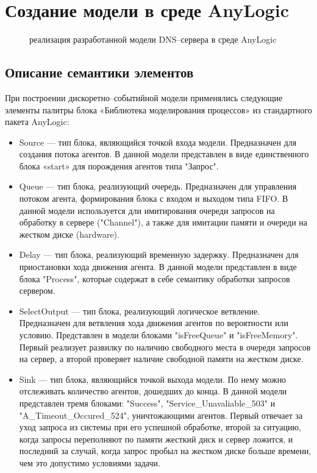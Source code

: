 \section{Создание модели в среде AnyLogic}
\begin{figure} [h]
    \caption{реализация разработанной модели DNS--сервера в среде AnyLogic}
\end{figure}


\subsection{Описание семантики элементов}
При построении дискоретно--событийной модели применялись следующие
элементы палитры блока «Библиотека моделирования процессов» из стандартного
пакета AnyLogic:
\begin{itemize}
    \item Source –-- тип блока, являющийся точкой входа модели. Предназначен для
    создания потока агентов. В данной модели представлен в виде единственного
    блока «start» для порождения агентов типа "Запрос".
    \item Queue –-- тип блока, реализующий очередь. Предназначен для управления
    потоком агента, формирования блока с входом и выходом типа FIFO. В
    данной модели используется дли имитирования очереди запросов на
    обработку в сервере ("Channel"), а также для имитации памяти и очереди на жестком
    диске (hardware).
    \item Delay –-- тип блока, реализующий временную задержку. Предназначен для
    приостановки хода движения агента. В данной модели представлен в виде
    блока "Process", которые содержат в себе семантику обработки запросов
    сервером.
    \item SelectOutput --- тип блока, реализующий логическое ветвление.
    Предназначен для ветвления хода движения агентов по вероятности или
    условию. Представлен в модели блоками "isFreeQueue" и "isFreeMemory".
    Первый реализует развилку по наличию свободного места в очереди запросов на сервер,
    а второй проверяет наличие свободной памяти на жестком диске.
    \item Sink –-- тип блока, являющийся точкой выхода модели. По нему можно
    отслеживать количество агентов, дошедших до конца. В данной модели
    представлен тремя блоками: "Success", "Service\_Unavaliable\_503" и
    "A\_Timeout\_Occured\_524", уничтожающими агентов. Первый отвечает за уход запроса из системы при его
    успешной обработке, второй за ситуацию, когда запросы переполняют по памяти жесткий диск и
    сервер ложится, и последний за случай, когда запрос пробыл на жестком диске больше времени, чем это
    допустимо условиями задачи.
\end{itemize}

